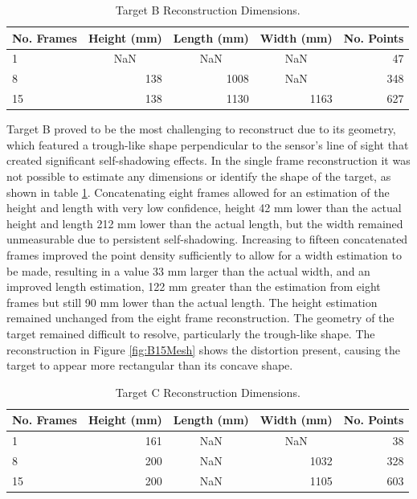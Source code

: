 \begin{table}[H]
\centering
\caption{Target B Reconstruction Dimensions.}
\begin{tabular}{|l|c|c|c|r|}
\hline
\multicolumn{1}{|c|}{\textbf{No. Frames}} & \textbf{Height (mm)} & \textbf{Length (mm)} & \textbf{Width (mm)} & \multicolumn{1}{l|}{\textbf{No. Points}} \\ \hline
1  & NaN                      & NaN                       & NaN                       & 47  \\ \hline
8  & \multicolumn{1}{r|}{138} & \multicolumn{1}{r|}{1008} & NaN                       & 348 \\ \hline
15 & \multicolumn{1}{r|}{138} & \multicolumn{1}{r|}{1130} & \multicolumn{1}{r|}{1163} & 627 \\ \hline
\end{tabular}
\label{tab:target_b}
\end{table}

Target B proved to be the most challenging to reconstruct due to its geometry, which featured a trough-like shape perpendicular to the sensor's line of sight that created significant self-shadowing effects. In the single frame reconstruction it was not possible to estimate any dimensions or identify the shape of the target, as shown in table \ref{tab:target_b}. Concatenating eight frames allowed for an estimation of the height and length with very low confidence, height 42 mm lower than the actual height and length 212 mm lower than the actual length, but the width remained unmeasurable due to persistent self-shadowing. Increasing to fifteen concatenated frames improved the point density sufficiently to allow for a width estimation to be made, resulting in a value 33 mm larger than the actual width, and an improved length estimation, 122 mm greater than the estimation from eight frames but still 90 mm lower than the actual length. The height estimation remained unchanged from the eight frame reconstruction. The geometry of the target remained difficult to resolve, particularly the trough-like shape. The reconstruction in Figure \ref{fig:B15Mesh} shows the distortion present, causing the target to appear more rectangular than its concave shape. 

\begin{table}[H]
\centering
\caption{Target C Reconstruction Dimensions.}
\begin{tabular}{|l|r|c|c|r|}
\hline
\multicolumn{1}{|c|}{\textbf{No. Frames}} &
  \multicolumn{1}{c|}{\textbf{Height (mm)}} &
  \textbf{Length (mm)} &
  \textbf{Width (mm)} &
  \multicolumn{1}{l|}{\textbf{No. Points}} \\ \hline
1  & 161 & NaN & NaN                       & 38  \\ \hline
8  & 200 & NaN & \multicolumn{1}{r|}{1032} & 328 \\ \hline
15 & 200 & NaN & \multicolumn{1}{r|}{1105} & 603 \\ \hline
\end{tabular}
\label{tab:target_c}
\end{table}

